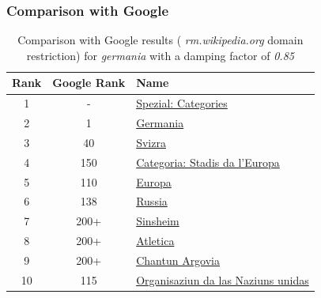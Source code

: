 \documentclass[10pt]{beamer}
\begin{document}
\begin{frame}
  \frametitle{Comparison with Google}
  \begin{table}
    \begin{tabular}{ | c | c | l | }
      \hline
      Rank & Google Rank & Name \\ \hline
      1 & - & \href{http://rm.wikipedia.org/wiki/Spezial:Categories}{Spezial: Categories} \\ \hline
      2 & 1 & \href{http://rm.wikipedia.org/wiki/Germania}{Germania} \\ \hline
      3 & 40 & \href{http://rm.wikipedia.org/wiki/Svizra}{Svizra} \\ \hline
      4 & 150 & \href{http://rm.wikipedia.org/wiki/Categoria:Stadis_da_l'Europa}{Categoria: Stadis da l'Europa} \\ \hline
      5 & 110 & \href{http://rm.wikipedia.org/wiki/Europa}{Europa} \\ \hline
      6 & 138 & \href{http://rm.wikipedia.org/wiki/Russia}{Russia} \\ \hline
      7 & 200+ & \href{http://rm.wikipedia.org/wiki/Sinsheim}{Sinsheim} \\ \hline
      8 & 200+& \href{http://rm.wikipedia.org/wiki/Atletica}{Atletica} \\ \hline
      9 & 200+ & \href{http://rm.wikipedia.org/wiki/Chantun_Argovia}{Chantun Argovia} \\ \hline
      10 & 115 & \href{http://rm.wikipedia.org/wiki/Organisaziun_da_las_Naziuns_unidas}{Organisaziun da las Naziuns unidas} \\ \hline
    \end{tabular}
    \caption{Comparison with Google results ( \emph{rm.wikipedia.org} domain restriction) for \emph{germania} with a damping factor of \emph{0.85}}
    \label{table_comparison}
  \end{table}
\end{frame}
\end{document}

